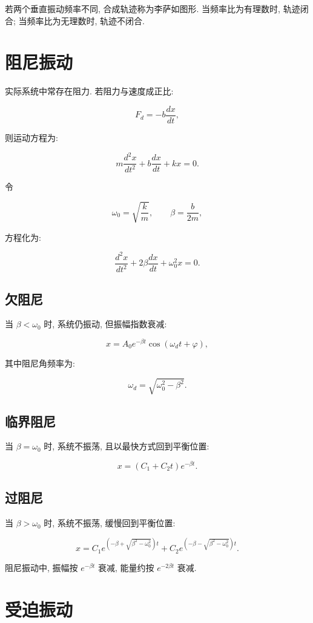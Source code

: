 \documentclass[
  a4paper,
]{ctexrep}
\begin{document}
若两个垂直振动频率不同, 合成轨迹称为李萨如图形. 当频率比为有理数时,
轨迹闭合; 当频率比为无理数时, 轨迹不闭合.

\section{阻尼振动}\label{ux963bux5c3cux632fux52a8}

实际系统中常存在阻力. 若阻力与速度成正比:

\[
F_d=-b\frac{dx}{dt},
\]

则运动方程为:

\[
m\frac{d^2x}{dt^2}+b\frac{dx}{dt}+kx=0.
\]

令

\[
\omega_0=\sqrt{\frac{k}{m}},\qquad \beta=\frac{b}{2m},
\]

方程化为:

\[
\frac{d^2x}{dt^2}+2\beta\frac{dx}{dt}+\omega_0^2x=0.
\]

\subsection{欠阻尼}\label{ux6b20ux963bux5c3c}

当 \(\beta<\omega_0\) 时, 系统仍振动, 但振幅指数衰减:

\[
x=A_0e^{-\beta t}\cos(\omega_d t+\varphi),
\]

其中阻尼角频率为:

\[
\omega_d=\sqrt{\omega_0^2-\beta^2}.
\]

\subsection{临界阻尼}\label{ux4e34ux754cux963bux5c3c}

当 \(\beta=\omega_0\) 时, 系统不振荡, 且以最快方式回到平衡位置:

\[
x=(C_1+C_2t)e^{-\beta t}.
\]

\subsection{过阻尼}\label{ux8fc7ux963bux5c3c}

当 \(\beta>\omega_0\) 时, 系统不振荡, 缓慢回到平衡位置:

\[
x=C_1e^{(-\beta+\sqrt{\beta^2-\omega_0^2})t}+C_2e^{(-\beta-\sqrt{\beta^2-\omega_0^2})t}.
\]

阻尼振动中, 振幅按 \(e^{-\beta t}\) 衰减, 能量约按 \(e^{-2\beta t}\)
衰减.

\section{受迫振动}\label{ux53d7ux8febux632fux52a8}
\end{document}
